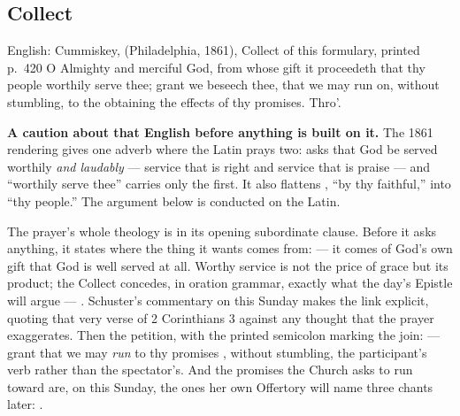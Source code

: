 \elementguard
\subsection*{Collect }


\begin{namedtranslation}{English: Cummiskey,  (Philadelphia, 1861), Collect of this formulary, printed p.~420}
O Almighty and merciful God, from whose gift it proceedeth that thy people
worthily serve thee; grant we beseech thee, that we may run on, without
stumbling, to the obtaining the effects of thy promises. Thro'.
\end{namedtranslation}

\textbf{A caution about that English before anything is built on it.} The 1861
rendering gives one adverb where the Latin prays two:  asks that God be served worthily \textit{and
laudably} --- service that is right and service that is praise --- and
``worthily serve thee'' carries only the first. It also flattens , ``by thy faithful,'' into ``thy people.'' The argument below
is conducted on the Latin.

The prayer's whole theology is in its opening subordinate clause. Before it
asks anything, it states where the thing it wants comes from:  ---
it comes of God's own gift that God is well served at all. Worthy service is
not the price of grace but its product; the Collect concedes, in oration
grammar, exactly what the day's Epistle will argue --- . Schuster's commentary on this Sunday makes the link explicit,
quoting that very verse of 2 Corinthians 3 against any thought that the
prayer exaggerates. Then the petition, with the printed semicolon marking
the join:  --- grant that we may \textit{run} to thy promises
, without stumbling, the participant's verb rather
than the spectator's. And the promises the Church asks to run toward are, on
this Sunday, the ones her own Offertory will name three chants later:
.

